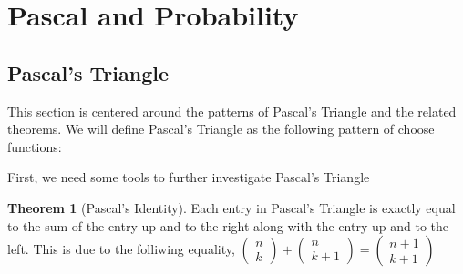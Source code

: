 \documentclass[11pt]{article}
\theoremstyle{definition}
\newtheorem{theorem}{Theorem}[section]
\begin{document}
\section{Pascal and Probability}
\subsection{Pascal's Triangle}
This section is centered around the patterns of Pascal's Triangle and the related theorems. We will define Pascal's Triangle as the following pattern of choose functions:
\begin{figure}[H]
\centering
\begin{subfigure}
    \centering
{}
\end{subfigure}
\begin{subfigure}
    \centering
{}
\end{subfigure}
\end{figure}
First, we need some tools to further investigate Pascal's Triangle
\begin{theorem}[Pascal's Identity] Each entry in Pascal's Triangle is exactly equal to the sum of the entry up and to the right along with the entry up and to the left. This is due to the folliwing equality,
    $
        \begin{pmatrix} n \\ k \end{pmatrix}
        +\begin{pmatrix} n \\ k+1 \end{pmatrix}
        =\begin{pmatrix} n+1 \\ k+1 \end{pmatrix}
    $
\end{theorem}
\end{document}
